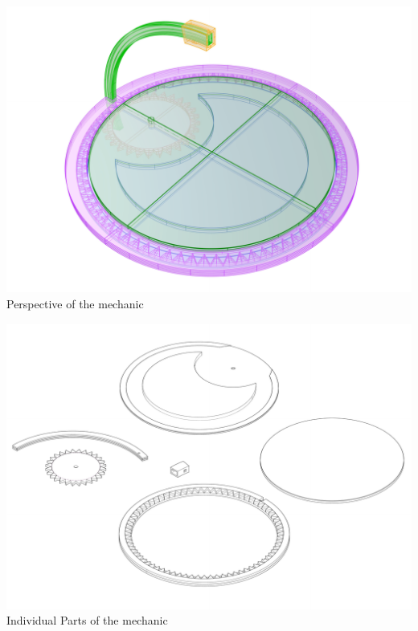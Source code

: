 \documentclass[a4paper,9pt]{article}
\begin{document}
    \begin{minipage}{0.48\linewidth}
        \centering
        \includegraphics[width=.95\linewidth]{Images/2 axis prototype total.pdf}
       \\{Perspective of the mechanic}
         \label{sunpath}
    \end{minipage}
    \hfill
    \begin{minipage}{0.48\linewidth}
         \centering
        \includegraphics[width=.95\linewidth]{Images/2 axis prototype disect.pdf}
       \\{Individual Parts of the mechanic}
        \label{sunpath1}
    \end{minipage}
\end{document}
